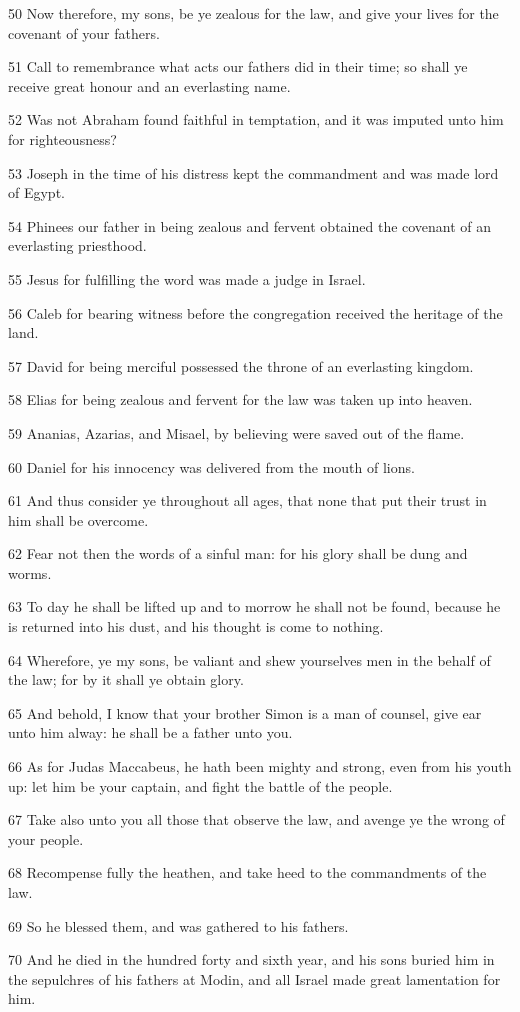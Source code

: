 \par 50 Now therefore, my sons, be ye zealous for the law, and give your lives for the covenant of your fathers.
\par 51 Call to remembrance what acts our fathers did in their time; so shall ye receive great honour and an everlasting name.
\par 52 Was not Abraham found faithful in temptation, and it was imputed unto him for righteousness?
\par 53 Joseph in the time of his distress kept the commandment and was made lord of Egypt.
\par 54 Phinees our father in being zealous and fervent obtained the covenant of an everlasting priesthood.
\par 55 Jesus for fulfilling the word was made a judge in Israel.
\par 56 Caleb for bearing witness before the congregation received the heritage of the land.
\par 57 David for being merciful possessed the throne of an everlasting kingdom.
\par 58 Elias for being zealous and fervent for the law was taken up into heaven.
\par 59 Ananias, Azarias, and Misael, by believing were saved out of the flame.
\par 60 Daniel for his innocency was delivered from the mouth of lions.
\par 61 And thus consider ye throughout all ages, that none that put their trust in him shall be overcome.
\par 62 Fear not then the words of a sinful man: for his glory shall be dung and worms.
\par 63 To day he shall be lifted up and to morrow he shall not be found, because he is returned into his dust, and his thought is come to nothing.
\par 64 Wherefore, ye my sons, be valiant and shew yourselves men in the behalf of the law; for by it shall ye obtain glory.
\par 65 And behold, I know that your brother Simon is a man of counsel, give ear unto him alway: he shall be a father unto you.
\par 66 As for Judas Maccabeus, he hath been mighty and strong, even from his youth up: let him be your captain, and fight the battle of the people.
\par 67 Take also unto you all those that observe the law, and avenge ye the wrong of your people.
\par 68 Recompense fully the heathen, and take heed to the commandments of the law.
\par 69 So he blessed them, and was gathered to his fathers.
\par 70 And he died in the hundred forty and sixth year, and his sons buried him in the sepulchres of his fathers at Modin, and all Israel made great lamentation for him.

